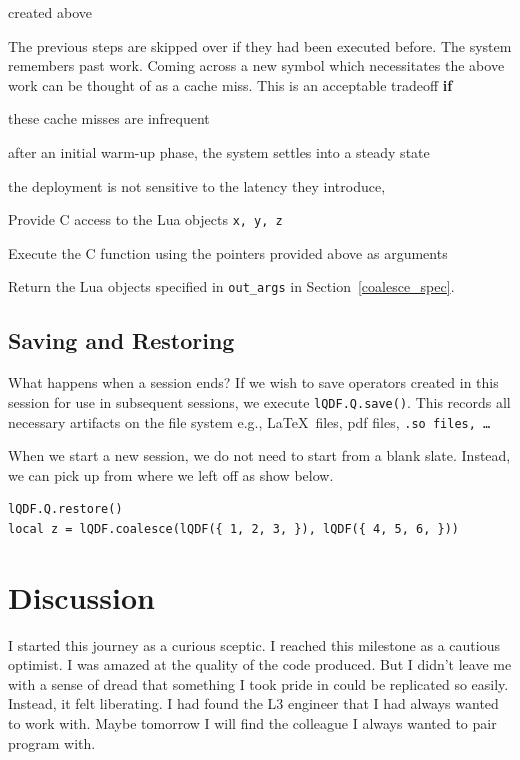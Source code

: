 \documentclass[letterpaper,12pt]{article}
\begin{document}
  created above
\item The previous steps are skipped over if they had been executed before. 
The system remembers past work. Coming across a new symbol which necessitates
the above work can be thought of as a cache miss. 
This is an acceptable tradeoff {\bf if}
\be
\item these cache misses are infrequent
\item after an initial warm-up phase, the system settles into a steady state
\item the deployment is not sensitive to the latency they introduce,
  \ee
\item Provide C access to the Lua objects {\tt x, y, z}
\item Execute the C function using the pointers provided above as arguments
\item Return the Lua objects specified in {\tt out\_args} in
  Section~\ref{coalesce_spec}.
  \ee

\subsection{Saving and Restoring}

What happens when a session ends? If we wish to save operators created in this
session for use in subsequent sessions, we execute \verb+lQDF.Q.save()+. This
records all necessary artifacts on the file system e.g., \LaTeX\ files, pdf
files, {\tt .so files, \ldots }

When we start a new session, we do not need to start from a blank slate.
Instead, we can pick up from where we left off as show below.
\begin{verbatim}
lQDF.Q.restore()
local z = lQDF.coalesce(lQDF({ 1, 2, 3, }), lQDF({ 4, 5, 6, }))
\end{verbatim}

\section{Discussion}

I started this journey as a curious sceptic. I reached this milestone 
as a cautious optimist. I was amazed at the quality of the code produced. 
But I didn't leave me with a sense of dread that something I took pride 
in could be replicated so easily. Instead, it felt liberating. 
I had found the L3 engineer that I had always wanted to work with. 
Maybe tomorrow I will find the colleague I always wanted to pair program with. 
\end{document}
